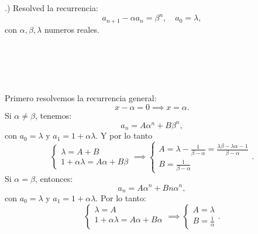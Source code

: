 \documentclass{article}
\begin{document}
.) Resolved la recurrencia:
\[
	a_{n+1} - \alpha a_n = \beta^n, \quad a_0 = \lambda,
\]
con $\alpha,\beta, \lambda$ numeros reales.
\\ \\ \\ \\ \\ \\
Primero resolvemos la recurrencia general:
\[
	x - \alpha = 0 \implies x = \alpha.
\]
Si $\alpha \neq \beta$, tenemos:
\[
	a_n = A \alpha^n + B\beta^n,
\]
con $a_0 = \lambda$ y $a_1 = 1 + \alpha\lambda$. Y por lo tanto
\[
	\begin{cases}
		\lambda = A + B \\
		1 + \alpha\lambda = A\alpha + B\beta
	\end{cases}
\implies
\begin{cases}
	A = \lambda - \frac{1}{\beta - \alpha} = \frac{\lambda\beta - \lambda\alpha - 1}{\beta - \alpha} \\
	B = \frac{1}{\beta - \alpha}
\end{cases}.
\]
Si $\alpha = \beta$, entonces:
\[
	a_n = A\alpha^n + Bn\alpha^n,
\]
con $a_0 = \lambda$ y $a_1 = 1 + \alpha\lambda$.
Por lo tanto:
\[
	\begin{cases}
		\lambda = A \\
		1 + \alpha\lambda = A\alpha + B\alpha \\
	\end{cases}
\implies
\begin{cases}
	A = \lambda \\
	B = \frac{1}{\alpha}
\end{cases}.
\]
\end{document}
